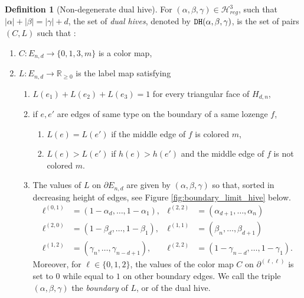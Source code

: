 \documentclass[11pt,a4paper]{amsart}
\providecommand{\R}{\mathbb R}
\providecommand{\dualhive}{\texttt{\textsc{DH}}}
\numberwithin{equation}{section}
\theoremstyle{definition}
\newtheorem{definition}[theorem]{Definition}
\begin{document}
\begin{definition}[Non-degenerate dual hive]
\label{def:limit_dual_hive}
    For $(\alpha, \beta, \gamma) \in \mathcal{H}_{reg}^3$, 
    such that $|\alpha| + |\beta| = |\gamma| + d$,
    the set of \textit{dual hives}, 
    denoted by $\dualhive(\alpha, \beta, \gamma)$, 
    is the set of pairs $(C, L)$ such that :
    \begin{enumerate}
        \item $C: E_{n,d} \rightarrow \{ 0, 1, 3, m \}$ is a color map,
        \item $L: E_{n,d} \rightarrow \R_{\geqslant 0} $ is the label map satisfying 
        \begin{enumerate}
            \item $L(e_1) + L(e_2) + L(e_3) = 1 $ for every triangular face of $H_{d, n}$,
            \item if $e,e'$ are edges of same type on the boundary of a same lozenge $f$,
            \begin{enumerate}
                \item $L(e)=L(e')$ if the middle edge of $f$ is colored $m$,
                \item $L(e)> L(e')$ if $h(e)> h(e')$ and the middle edge of $f$ is not colored $m$.
            \end{enumerate}
            \item The values of $L$ on $\partial E_{n,d}$ are given 
            by $(\alpha, \beta, \gamma)$ so that, sorted in decreasing height 
            of edges, see Figure \ref{fig:boundary_limit_hive} below.
            \begin{align*}
                \ell^{(0, 1)} &= (1 - \alpha_d, \dots, 1 - \alpha_1),
                &\ell^{(2, 2)} &= (\alpha_{d+1}, \dots, \alpha_{n}) \\
                \ell^{(2, 0)} &= (1 - \beta_d, \dots, 1 - \beta_1),
                &\ell^{(1, 1)} &= (\beta_{n}, \dots, \beta_{d+1}) \\
                \ell^{(1, 2)} &= (\gamma_n, \dots, \gamma_{n-d+1}), 
                &\ell^{(2, 2)} &= (1-\gamma_{n-d}, \dots, 1- \gamma_{1}).
            \end{align*}
            Moreover, for $\ell \in \{0,1,2\}$, the values of the color map $C$ on  
            $\partial^{(\ell, \ell)}$ is set to $0$ while equal to $1$ on other boundary edges. 
            We call the triple $(\alpha, \beta, \gamma)$ the \textit{boundary} of $L$, or 
            of the dual hive.
        \end{enumerate}
    \end{enumerate}
\end{definition}
\end{document}
